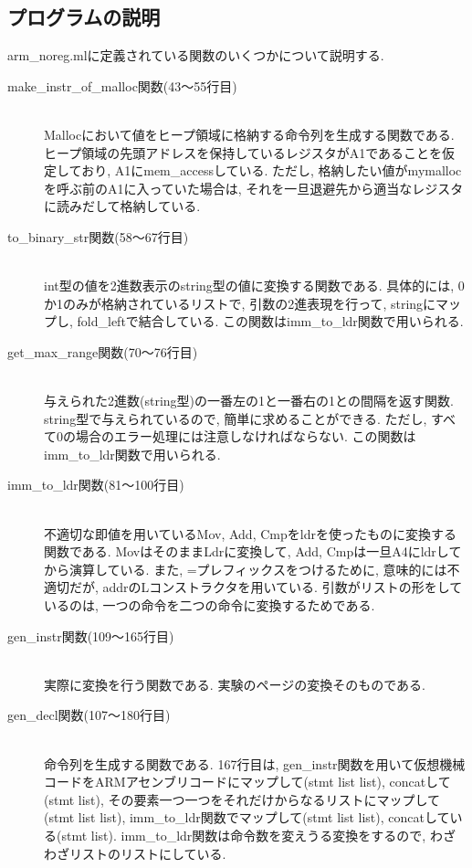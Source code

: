 \documentclass{jarticle}
\begin{document}
\subsection{プログラムの説明}
arm\_noreg.mlに定義されている関数のいくつかについて説明する.
\begin{description}
\item[make\_instr\_of\_malloc関数(43～55行目)] \leavevmode \\
Mallocにおいて値をヒープ領域に格納する命令列を生成する関数である. ヒープ領域の先頭アドレスを保持しているレジスタがA1であることを仮定しており, A1にmem\_accessしている. ただし, 格納したい値がmymallocを呼ぶ前のA1に入っていた場合は, それを一旦退避先から適当なレジスタに読みだして格納している.
\item[to\_binary\_str関数(58～67行目)] \leavevmode \\
int型の値を2進数表示のstring型の値に変換する関数である. 具体的には, 0か1のみが格納されているリストで, 引数の2進表現を行って, stringにマップし, fold\_leftで結合している. この関数はimm\_to\_ldr関数で用いられる.
\item[get\_max\_range関数(70～76行目)] \leavevmode \\
与えられた2進数(string型)の一番左の1と一番右の1との間隔を返す関数. string型で与えられているので, 簡単に求めることができる. ただし, すべて0の場合のエラー処理には注意しなければならない. この関数はimm\_to\_ldr関数で用いられる.
\item[imm\_to\_ldr関数(81～100行目)] \leavevmode \\
不適切な即値を用いているMov, Add, Cmpをldrを使ったものに変換する関数である. MovはそのままLdrに変換して, Add, Cmpは一旦A4にldrしてから演算している. また, =プレフィックスをつけるために, 意味的には不適切だが, addrのLコンストラクタを用いている. 引数がリストの形をしているのは, 一つの命令を二つの命令に変換するためである.
\item[gen\_instr関数(109～165行目)] \leavevmode \\
実際に変換を行う関数である. 実験のページの変換そのものである.
\item[gen\_decl関数(107～180行目)] \leavevmode \\
命令列を生成する関数である. 167行目は, gen\_instr関数を用いて仮想機械コードをARMアセンブリコードにマップして(stmt list list), concatして(stmt list), その要素一つ一つをそれだけからなるリストにマップして(stmt list list), imm\_to\_ldr関数でマップして(stmt list list), concatしている(stmt list). imm\_to\_ldr関数は命令数を変えうる変換をするので, わざわざリストのリストにしている.
\end{description}
\end{document}
